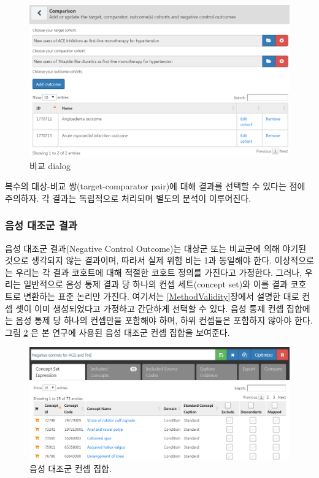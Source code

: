 \documentclass[11pt]{book}
\theoremstyle{definition}
\theoremstyle{definition}
\theoremstyle{definition}
\theoremstyle{remark}
\begin{document}
\begin{figure}

{\centering \includegraphics[width=1\linewidth]{images/PopulationLevelEstimation/comparisons} 

}

\caption{비교 dialog}\label{fig:comparisons}
\end{figure}

복수의 대상-비교 쌍(target-comparator pair)에 대해 결과를 선택할 수
있다는 점에 주의하자. 각 결과는 독립적으로 처리되며 별도의 분석이
이루어진다.

\subsubsection*{음성 대조군 결과}\label{--}

음성 대조군 결과(Negative Control Outcome)는 대상군 또는 비교군에 의해
야기된 것으로 생각되지 않는 결과이며, 따라서 실제 위험 비는 1과 동일해야
한다. 이상적으로는 우리는 각 결과 코호트에 대해 적절한 코호트 정의를
가진다고 가정한다. 그러나, 우리는 일반적으로 음성 통제 결과 당 하나의
컨셉 세트(concept set)와 이를 결과 코호트로 변환하는 표준 논리만 가진다.
여기서는 \ref{MethodValidity}장에서 설명한 대로 컨셉 셋이 이미
생성되었다고 가정하고 간단하게 선택할 수 있다. 음성 통제 컨셉 집합에는
음성 통제 당 하나의 컨셉만을 포함해야 하며, 하위 컨셉들은 포함하지
않아야 한다. 그림 \ref{fig:ncConceptSet} 은 본 연구에 사용된 음성 대조군
컨셉 집합을 보여준다.

\begin{figure}

{\centering \includegraphics[width=1\linewidth]{images/PopulationLevelEstimation/ncConceptSet} 

}

\caption{음성 대조군 컨셉 집합.}\label{fig:ncConceptSet}
\end{figure}
\end{document}
